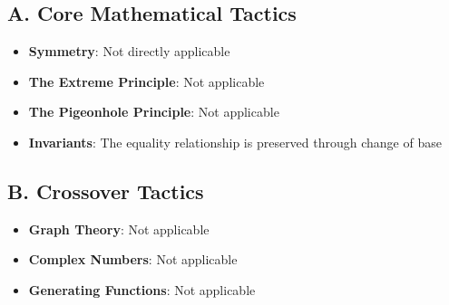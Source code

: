 \documentclass[12pt]{article}
\begin{document}
\begin{tacticalbox}
\subsection*{A. Core Mathematical Tactics}
\begin{itemize}[leftmargin=*]
    \item \textbf{Symmetry}: Not directly applicable
    \item \textbf{The Extreme Principle}: Not applicable
    \item \textbf{The Pigeonhole Principle}: Not applicable
    \item \textbf{Invariants}: The equality relationship is preserved through change of base
\end{itemize}

\subsection*{B. Crossover Tactics}
\begin{itemize}[leftmargin=*]
    \item \textbf{Graph Theory}: Not applicable
    \item \textbf{Complex Numbers}: Not applicable
    \item \textbf{Generating Functions}: Not applicable
\end{itemize}
\end{tacticalbox}
\end{document}
